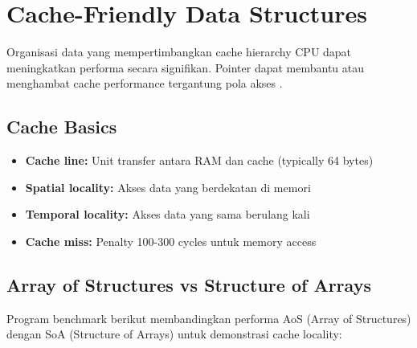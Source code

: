 \documentclass[../main.tex]{subfiles}
\begin{document}
\section{Cache-Friendly Data Structures}
Organisasi data yang mempertimbangkan cache hierarchy CPU dapat meningkatkan performa secara signifikan. Pointer dapat membantu atau menghambat cache performance tergantung pola akses \parencite{cpp-reference}.

\subsection{Cache Basics}
\begin{itemize}
  \item \textbf{Cache line:} Unit transfer antara RAM dan cache (typically 64 bytes)
  \item \textbf{Spatial locality:} Akses data yang berdekatan di memori
  \item \textbf{Temporal locality:} Akses data yang sama berulang kali
  \item \textbf{Cache miss:} Penalty 100-300 cycles untuk memory access
\end{itemize}

\subsection{Array of Structures vs Structure of Arrays}

Program benchmark berikut membandingkan performa AoS (Array of Structures) dengan SoA (Structure of Arrays) untuk demonstrasi cache locality:
\end{document}
